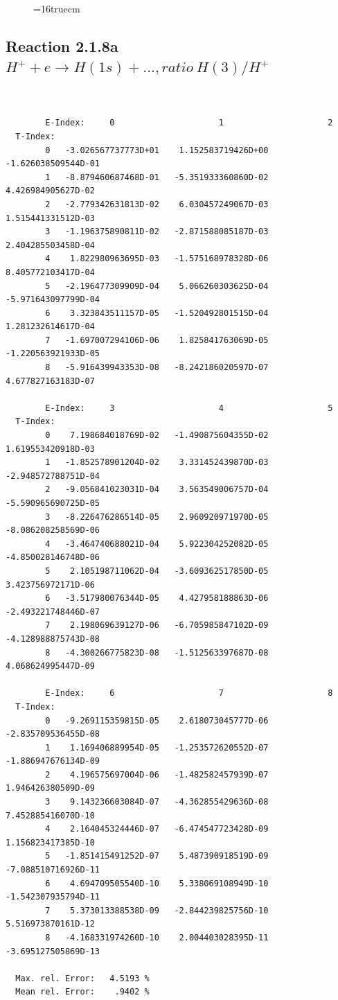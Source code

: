 \documentclass[12pt,dvips]{article}
\begin{document}
\begin{figure} \label{2.1.8_equil}
\epsfxsize=16truecm
\end{figure}
\newpage


\subsection{
Reaction 2.1.8a  $H^+ + e \rightarrow H(1s) + ...,  ratio ~ H(3)/H^+$
}

\begin{small}\begin{verbatim}


        E-Index:     0                     1                     2
  T-Index:
        0   -3.026567737773D+01    1.152583719426D+00   -1.626038509544D-01
        1   -8.879460687468D-01   -5.351933360860D-02    4.426984905627D-02
        2   -2.779342631813D-02    6.030457249067D-03    1.515441331512D-03
        3   -1.196375890811D-02   -2.871588085187D-03    2.404285503458D-04
        4    1.822980963695D-03   -1.575168978328D-06    8.405772103417D-04
        5   -2.196477309909D-04    5.066260303625D-04   -5.971643097799D-04
        6    3.323843511157D-05   -1.520492801515D-04    1.281232614617D-04
        7   -1.697007294106D-06    1.825841763069D-05   -1.220563921933D-05
        8   -5.916439943353D-08   -8.242186020597D-07    4.677827163183D-07

        E-Index:     3                     4                     5
  T-Index:
        0    7.198684018769D-02   -1.490875604355D-02    1.619553420918D-03
        1   -1.852578901204D-02    3.331452439870D-03   -2.948572788751D-04
        2   -9.056841023031D-04    3.563549006757D-04   -5.590965690725D-05
        3   -8.226476286514D-05    2.960920971970D-05   -8.086208258569D-06
        4   -3.464740688021D-04    5.922304252082D-05   -4.850028146748D-06
        5    2.105198711062D-04   -3.609362517850D-05    3.423756972171D-06
        6   -3.517980076344D-05    4.427958188863D-06   -2.493221748446D-07
        7    2.198069639127D-06   -6.705985847102D-09   -4.128988875743D-08
        8   -4.300266775823D-08   -1.512563397687D-08    4.068624995447D-09

        E-Index:     6                     7                     8
  T-Index:
        0   -9.269115359815D-05    2.618073045777D-06   -2.835709536455D-08
        1    1.169406889954D-05   -1.253572620552D-07   -1.886947676134D-09
        2    4.196575697004D-06   -1.482582457939D-07    1.946426380509D-09
        3    9.143236603084D-07   -4.362855429636D-08    7.452885416070D-10
        4    2.164045324446D-07   -6.474547723428D-09    1.156823417385D-10
        5   -1.851415491252D-07    5.487390918519D-09   -7.088510716926D-11
        6    4.694709505540D-10    5.338069108949D-10   -1.542307935794D-11
        7    5.373013388538D-09   -2.844239825756D-10    5.516973870161D-12
        8   -4.168331974260D-10    2.004403028395D-11   -3.695127505869D-13

  Max. rel. Error:   4.5193 %
  Mean rel. Error:    .9402 %

\end{verbatim}\end{small}
\end{document}
